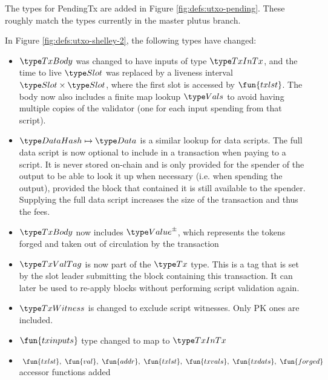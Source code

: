 The types for PendingTx are added in Figure \ref{fig:defs:utxo-pending}.
These roughly match the types currently in the master plutus branch.

In Figure \ref{fig:defs:utxo-shelley-2}, the following types have changed:

\begin{itemize}
  \item $\TxBody$ was changed to have inputs of type $\TxInTx$, and the
  time to live $\Slot$ was replaced by a liveness interval $\Slot \times \Slot$,
  where the first slot is accessed by $\fun{txlst}$. The body now also includes
  a finite map lookup $\Vals$ to avoid having multiple
  copies of the validator (one for each input spending from that script).
  \item $\HashDat \mapsto \Data$ is a similar lookup for data scripts.
  The full data script is now optional to include in a transaction when
  paying to a script. It is never
  stored on-chain and is only provided for the spender of the output
  to be able to look it up when necessary (i.e. when spending the output),
  provided the block that contained it is still available to the spender.
  Supplying the full data script increases the size of the transaction and
  thus the fees.
  \item $\TxBody$ now includes $\ValuePM$, which represents
  the tokens forged and taken out of circulation by the transaction
  \item $\TxValTag$ is now part of the $\Tx$ type. This is a tag that is
  set by the slot leader submitting the block containing this transaction.
  It can later be used to re-apply blocks without performing script validation
  again.
  \item $\TxWitness$ is changed to exclude script witnesses. Only PK ones
  are included.
  \item $\fun{txinputs}$ type changed to map to $\TxInTx$
  \item $~\fun{txlst},~\fun{val},~\fun{addr},~\fun{txlst},~\fun{txvals},~\fun{txdats},
  ~\fun{forged}$
  accessor functions added
\end{itemize}


